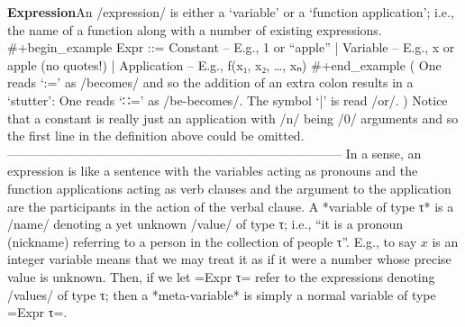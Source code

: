 \documentclass[11pt]{article}
\begin{document}
\vspace{1em}\textbf{Expression}\quad\label{org-special-block-extras-glossary-Expression}An /expression/ is either a ‘variable’ or a ‘function application’; i.e., the name of a function along with a number of existing expressions.  #+begin_example  Expr ::= Constant \quad  \quad -- E.g., 1 or “apple”  \quad  \quad  \quad | \quad Variable \quad  \quad -- E.g., x or apple (no quotes!)  \quad  \quad  \quad | \quad Application -- E.g., f(x₁, x₂, …, xₙ) #+end_example  ( One reads ‘:=’ as /becomes/ and so the addition of an extra colon results in a ‘stutter’: One reads ‘∷=’ as /be-becomes/. The symbol ‘|’ is read /or/. )  Notice that a constant is really just an application with /n/ being /0/ arguments and so the first line in the definition above could be omitted.  --------------------------------------------------------------------------------  In a sense, an expression is like a sentence with the variables acting as pronouns and the function applications acting as verb clauses and the argument to the application are the participants in the action of the verbal clause.  A *variable of type τ* is a /name/ denoting a yet unknown /value/ of type τ; i.e., “it is a pronoun (nickname) referring to a person in the collection of people τ”. E.g., to say $x$ is an integer variable means that we may treat it as if it were a number whose precise value is unknown. Then, if we let =Expr τ= refer to the expressions denoting /values/ of type τ; then a *meta-variable* is simply a normal variable of type =Expr τ=. 
\end{document}
